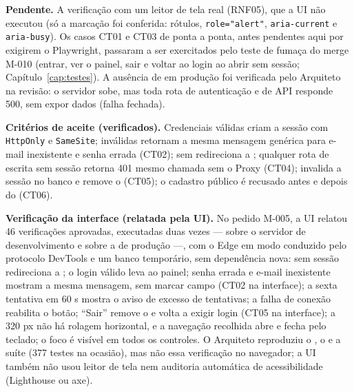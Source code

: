 \textbf{Pendente.} A verificação com um leitor de tela real (RNF05), que a UI não executou (só a marcação foi conferida: rótulos, \texttt{role="alert"}, \texttt{aria-current} e \texttt{aria-busy}). Os casos CT01 e CT03 de ponta a ponta, antes pendentes aqui por exigirem o Playwright, passaram a ser exercitados pelo teste de fumaça do merge M-010 (entrar, ver o painel, sair e voltar ao login ao abrir  sem sessão; Capítulo~\ref{cap:testes}). A ausência de  em produção foi verificada pelo Arquiteto na revisão: o servidor sobe, mas toda rota de autenticação e de API responde 500, sem expor dados (falha fechada).

\textbf{Critérios de aceite (verificados).} Credenciais válidas criam a sessão com  \texttt{HttpOnly} e \texttt{SameSite}; inválidas retornam a mesma mensagem genérica para e-mail inexistente e senha errada (CT02);  sem  redireciona a ; qualquer rota de escrita sem sessão retorna 401 mesmo chamada sem o Proxy (CT04);  invalida a sessão no banco e remove o  (CT05); o cadastro público é recusado antes e depois do  (CT06).

\textbf{Verificação da interface (relatada pela UI).} No pedido M-005, a UI relatou 46 verificações aprovadas, executadas duas vezes --- sobre o servidor de desenvolvimento e sobre a  de produção ---, com o Edge em modo  conduzido pelo protocolo DevTools e um banco temporário, sem dependência nova:  sem sessão redireciona a ; o login válido leva ao painel; senha errada e e-mail inexistente mostram a mesma mensagem, sem marcar campo (CT02 na interface); a sexta tentativa em 60 s mostra o aviso de excesso de tentativas; a falha de conexão reabilita o botão; ``Sair'' remove o  e  volta a exigir login (CT05 na interface); a 320 px não há rolagem horizontal, e a navegação recolhida abre e fecha pelo teclado; o foco é visível em todos os controles. O Arquiteto reproduziu o , o  e a suíte (377 testes na ocasião), mas não essa verificação no navegador; a UI também não usou leitor de tela nem auditoria automática de acessibilidade (Lighthouse ou axe).



